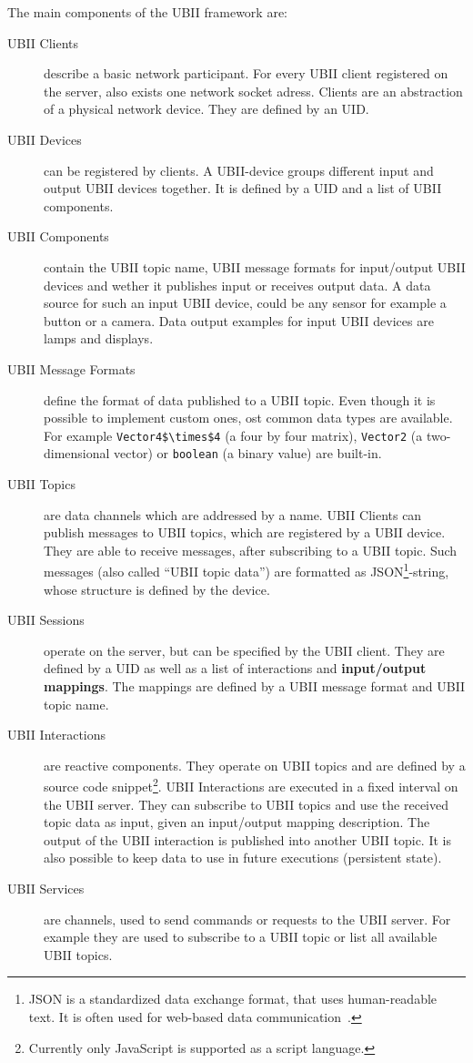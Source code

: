 The main components of the \ac{UBII} framework are:
\begin{description}
	\item[\ac{UBII} Clients] describe a basic network participant. For every \ac{UBII} client registered on the server, also exists one network socket adress. Clients are an abstraction of a physical network device. They are defined by an \ac{UID}. 
	\item[\ac{UBII} Devices] can be registered by clients. A \ac{UBII}-device groups different input and output \ac{UBII} devices together. It is defined by a \ac{UID} and a list of \ac{UBII} components.
  \item[\ac{UBII} Components] contain the \ac{UBII} topic name, \ac{UBII} message formats for input/output \ac{UBII} devices and wether it publishes input or receives output data. A data source for such an input \ac{UBII} device, could be any sensor for example a button or a camera. Data output examples for input \ac{UBII} devices are lamps and displays.
  \item[\ac{UBII} Message Formats] define the format of data published to a \ac{UBII} topic. Even though it is possible to implement custom ones, ost common data types are available. For example \lstinline[mathescape=true]{Vector4$\times$4} (a four by four matrix), \lstinline{Vector2} (a two-dimensional vector) or \lstinline{boolean} (a binary value) are built-in.
	\item[\ac{UBII} Topics] are data channels which are addressed by a name. \ac{UBII} Clients can publish messages to \ac{UBII} topics, which are registered by a \ac{UBII} device. They are able to receive messages, after subscribing to a \ac{UBII} topic. Such messages (also called \enquote{\ac{UBII} topic data}) are formatted as JSON\footnote{JSON is a standardized data exchange format, that uses human-readable text. It is often used for web-based data communication~\cite[iii]{ECMAInternational.2017}.}-string, whose structure is defined by the device.
	\item[\ac{UBII} Sessions] operate on the server, but can be specified by the \ac{UBII} client. They are defined by a \ac{UID} as well as a list of interactions and \textbf{input/output mappings}. The mappings are defined by a \ac{UBII} message format and \ac{UBII} topic name.
	\item[\ac{UBII} Interactions] are reactive components. They operate on \ac{UBII} topics and are defined by a source code snippet\footnote{Currently only JavaScript is supported as a script language.}. \ac{UBII} Interactions are executed in a fixed interval on the \ac{UBII} server. They can subscribe to \ac{UBII} topics and use the received topic data as input, given an input/output mapping description. The output of the \ac{UBII} interaction is published into another \ac{UBII} topic. It is also possible to keep data to use in future executions (persistent state).
	\item[\ac{UBII} Services] are channels, used to send commands or requests to the \ac{UBII} server. For example they are used to subscribe to a \ac{UBII} topic or list all available \ac{UBII} topics.
\end{description}


